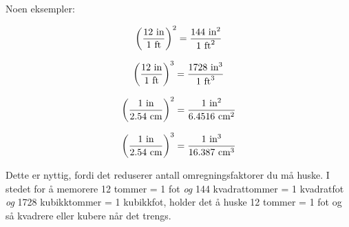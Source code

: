 Noen eksempler:

$$\left({{12 \hbox{ in}} \over {1 \hbox{ ft}}}\right)^2 = {{144 \hbox{ in}^2} \over {1 \hbox{ ft}^2}}$$

\vskip 10pt

$$\left({{12 \hbox{ in}} \over {1 \hbox{ ft}}}\right)^3 = {{1728 \hbox{ in}^3} \over {1 \hbox{ ft}^3}}$$

\vskip 10pt

$$\left({{1 \hbox{ in}} \over {2.54 \hbox{ cm}}}\right)^2 = {{1 \hbox{ in}^2} \over {6.4516 \hbox{ cm}^2}}$$

\vskip 10pt

$$\left({{1 \hbox{ in}} \over {2.54 \hbox{ cm}}}\right)^3 = {{1 \hbox{ in}^3} \over {16.387 \hbox{ cm}^3}}$$

Dette er nyttig, fordi det reduserer antall omregningsfaktorer du må huske. I stedet for å memorere 12 tommer = 1 fot {\it og} 144 kvadrattommer = 1 kvadratfot {\it og} 1728 kubikktommer = 1 kubikkfot, holder det å huske 12 tommer = 1 fot og så kvadrere eller kubere når det trengs.









